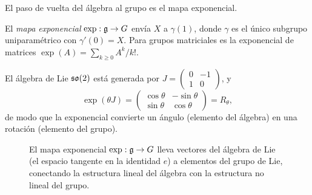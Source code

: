 El paso de vuelta del \'algebra al grupo es el mapa exponencial.

\begin{definition}
\label{def:found:exp}
El \emph{mapa exponencial} $\exp : \mathfrak{g} \to G$ env\'ia $X$ a $\gamma(1)$, donde
$\gamma$ es el \'unico subgrupo uniparam\'etrico con $\gamma'(0) = X$. Para grupos
matriciales es la exponencial de matrices $\exp(A) = \sum_{k\ge 0} A^k/k!$.
\end{definition}

\begin{example}
\label{ex:found:exp-so2}
El \'algebra de Lie $\mathfrak{so}(2)$ est\'a generada por
$J = \left(\begin{smallmatrix}0 & -1\\ 1 & 0\end{smallmatrix}\right)$, y
\[
  \exp(\theta J) = \begin{pmatrix}\cos\theta & -\sin\theta\\
  \sin\theta & \cos\theta\end{pmatrix} = R_\theta,
\]
de modo que la exponencial convierte un \'angulo (elemento del \'algebra) en una
rotaci\'on (elemento del grupo).
\end{example}

\begin{figure}[h]
\centering
{}
\caption[Mapa exponencial]{El mapa exponencial $\exp : \mathfrak{g} \to G$ lleva
vectores del \'algebra de Lie (el espacio tangente en la identidad $e$) a elementos
del grupo de Lie, conectando la estructura lineal del \'algebra con la estructura no
lineal del grupo.}
\label{fig:found:exp}
\end{figure}

